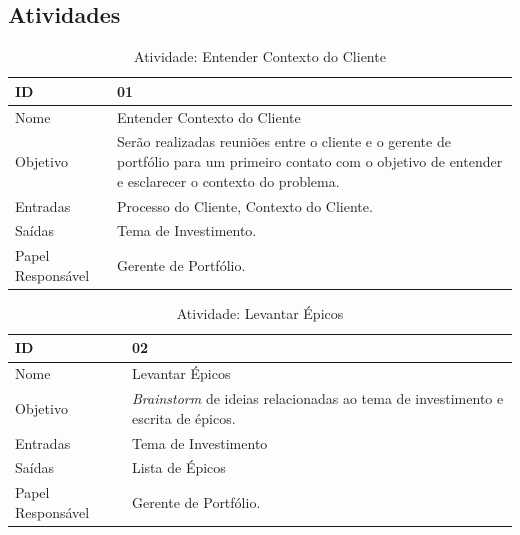 \subsection{Atividades}

  \begin{table}[H]
    \centering
      \begin{tabular}{| m{5em} | m{10cm} |}
        \hline
        ID       & 01   \\ \hline
        Nome     & Entender Contexto do Cliente   \\ \hline
        Objetivo & Serão realizadas reuniões entre o cliente e o gerente de portfólio para um primeiro contato com o objetivo de entender e esclarecer o contexto do problema. \\ \hline
        Entradas & Processo do Cliente, Contexto do Cliente.   \\ \hline
        Saídas   & Tema de Investimento. \\ \hline
        Papel Responsável   & Gerente de Portfólio. \\ \hline
      \end{tabular}
      \caption{Atividade: Entender Contexto do Cliente }
      \label{tabela:atividade1}
  \end{table}

  \begin{table}[H]
    \centering
      \begin{tabular}{| m{5em} | m{10cm} |}
        \hline
        ID       & 02   \\ \hline
        Nome     & Levantar Épicos   \\ \hline
        Objetivo & \textit{Brainstorm} de ideias relacionadas ao tema de investimento e escrita de épicos. \\ \hline
        Entradas & Tema de Investimento   \\ \hline
        Saídas   & Lista de Épicos \\ \hline
        Papel Responsável   & Gerente de Portfólio. \\ \hline
      \end{tabular}
      \caption{Atividade: Levantar Épicos}
      \label{tabela:atividade2}
  \end{table}

